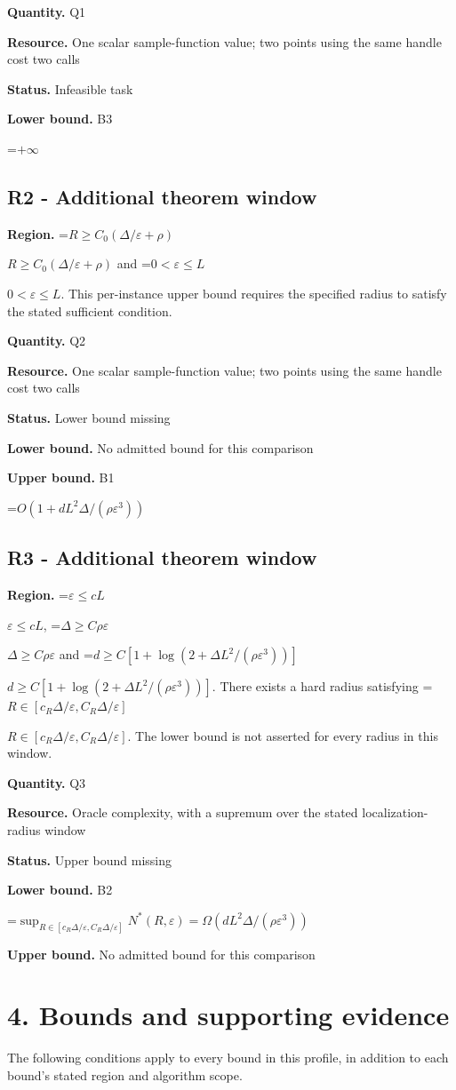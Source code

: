 \documentclass[10pt,a4paper]{article}
\newcommand{\AtlasMath}[1]{\par\begingroup\centering\setbox0=\hbox{$\displaystyle #1$}\ifdim\wd0>1.4\linewidth\typeout{ATLAS WIDE FORMULA: \the\wd0}\fi\ifdim\wd0>\linewidth\resizebox{\linewidth}{!}{\box0}\else\box0\fi\par\endgroup}
\newcommand{\AtlasInlineMath}[1]{\begingroup\setbox0=\hbox{$#1$}\ifdim\wd0>.4\linewidth\endgroup\AtlasMath{#1}\else\endgroup$#1$\fi}
\begin{document}
\textbf{Quantity.} Q1

\textbf{Resource.} One scalar sample-function value; two points using the same handle cost two calls

\textbf{Status.} Infeasible task

\textbf{Lower bound.} B3

\AtlasMath{+\infty}
\subsection{R2 - Additional theorem window}
\textbf{Region.} \AtlasInlineMath{R\ge C_0(\Delta/\varepsilon+\rho)} and \AtlasInlineMath{0<\varepsilon\le L}. This per-instance upper bound requires the specified radius to satisfy the stated sufficient condition.

\textbf{Quantity.} Q2

\textbf{Resource.} One scalar sample-function value; two points using the same handle cost two calls

\textbf{Status.} Lower bound missing

\textbf{Lower bound.} No admitted bound for this comparison

\textbf{Upper bound.} B1

\AtlasMath{O(1+dL^2\Delta/(\rho\varepsilon^3))}
\subsection{R3 - Additional theorem window}
\textbf{Region.} \AtlasInlineMath{\varepsilon\le cL}, \AtlasInlineMath{\Delta\ge C\rho\varepsilon} and \AtlasInlineMath{d\ge C[1+\log(2+\Delta L^2/(\rho\varepsilon^3))]}. There exists a hard radius satisfying \AtlasInlineMath{R\in[c_R\Delta/\varepsilon,C_R\Delta/\varepsilon]}. The lower bound is not asserted for every radius in this window.

\textbf{Quantity.} Q3

\textbf{Resource.} Oracle complexity, with a supremum over the stated localization-radius window

\textbf{Status.} Upper bound missing

\textbf{Lower bound.} B2

\AtlasMath{\sup_{R\in[c_R\Delta/\varepsilon,C_R\Delta/\varepsilon]}N^*(R,\varepsilon)=\Omega(dL^2\Delta/(\rho\varepsilon^3))}
\textbf{Upper bound.} No admitted bound for this comparison

\section{4. Bounds and supporting evidence}
The following conditions apply to every bound in this profile, in addition to each bound's stated region and algorithm scope.
\end{document}
